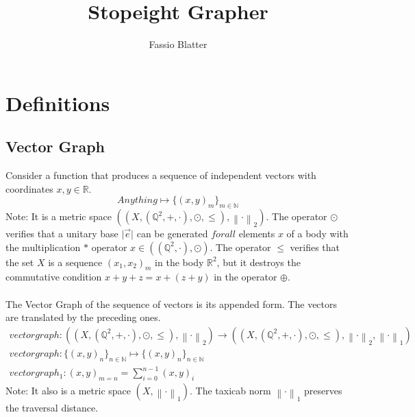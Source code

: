 \documentclass{report}
\newcommand\norm[1]{\left\lVert#1\right\rVert}
\begin{document}
\title{Stopeight Grapher}
\author{Fassio Blatter}
\maketitle

\chapter{Definitions}
\section{Vector Graph}
Consider a function that produces a sequence of independent vectors with coordinates $x,y \in \mathbb{R}$.
\begin{equation}
Anything \mapsto \{(x,y)_{m}\}_{m \in \mathbb{N}}
\end{equation}
Note: It is a metric space $((X,(\mathbb{Q}^2,+,\cdot),\odot,\leq), \norm{\cdot}_2)$. The operator $\odot$ verifies that a unitary base $\lvert \overrightarrow{e} \rvert$ can be generated $for all$ elements $x$ of a body with the multiplication $*$ operator $x \in ((\mathbb{Q}^2,\cdot),\odot)$. The operator $\leq$ verifies that the set $X$ is a sequence $(x_{1},x_{2})_{m}$ in the body $\mathbb{R}^2$, but it destroys the commutative condition $x+y+z=x+(z+y)$ in the operator $\oplus$.\\\\
The Vector Graph of the sequence of vectors is its appended form. The vectors are translated by the preceding ones.
\begin{align}
vectorgraph: ((X,(\mathbb{Q}^2,+,\cdot),\odot,\leq), \norm{\cdot}_2)\rightarrow ((X,(\mathbb{Q}^2,+,\cdot),\odot,\leq), \norm{\cdot}_2, \norm{\cdot}_1)\\
vectorgraph: \{(x,y)_{n}\}_{n \in \mathbb{N}} \mapsto \{(x,y)_{n}\}_{n \in \mathbb{N}}\\
vectorgraph_{1}: (x,y)_{m=n}=\sum_{i=0}^{n-1} (x,y)_{i}
\end{align}
Note: It also is a metric space $(X,\norm{\cdot}_1)$. The taxicab norm $\norm{\cdot}_1$ preserves the traversal distance.
\end{document}
